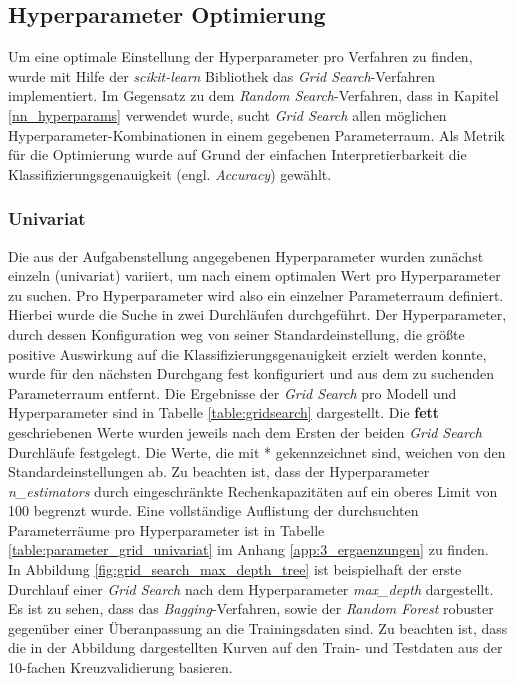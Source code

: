 \subsection{Hyperparameter Optimierung}
Um eine optimale Einstellung der Hyperparameter pro Verfahren zu finden, wurde mit Hilfe der \emph{scikit-learn} Bibliothek das \emph{Grid Search}-Verfahren implementiert. Im Gegensatz zu dem \emph{Random Search}-Verfahren, dass in Kapitel \ref{nn_hyperparams} verwendet wurde, sucht \emph{Grid Search} allen möglichen Hyperparameter-Kombinationen in einem gegebenen Parameterraum.  Als Metrik für die Optimierung wurde auf Grund der einfachen Interpretierbarkeit die Klassifizierungsgenauigkeit (engl. \emph{Accuracy}) gewählt.

\subsubsection{Univariat}
\label{section:univariat}
Die aus der Aufgabenstellung angegebenen Hyperparameter wurden zunächst einzeln (univariat) variiert, um nach einem optimalen Wert pro Hyperparameter zu suchen. Pro Hyperparameter wird also ein einzelner Parameterraum definiert. Hierbei wurde die Suche in zwei Durchläufen durchgeführt. Der Hyperparameter, durch dessen Konfiguration weg von seiner Standardeinstellung, die größte positive Auswirkung auf die Klassifizierungsgenauigkeit erzielt werden konnte, wurde für den  nächsten Durchgang fest konfiguriert und aus dem zu suchenden Parameterraum entfernt. Die Ergebnisse der \emph{Grid Search} pro Modell und Hyperparameter sind in Tabelle \ref{table:gridsearch} dargestellt. Die \textbf{fett} geschriebenen Werte wurden jeweils nach dem Ersten der beiden \emph{Grid Search} Durchläufe festgelegt. Die Werte, die mit * gekennzeichnet sind, weichen von den Standardeinstellungen ab. Zu beachten ist, dass der Hyperparameter \emph{n\_estimators} durch eingeschränkte Rechenkapazitäten auf ein oberes Limit von 100 begrenzt wurde. Eine vollständige Auflistung der durchsuchten Parameterräume pro Hyperparameter ist in Tabelle \ref{table:parameter_grid_univariat} im Anhang \ref{app:3_ergaenzungen} zu finden.\\
\noindent \hspace*{7mm}
In Abbildung \ref{fig:grid_search_max_depth_tree} ist  beispielhaft der erste Durchlauf einer \emph{Grid Search} nach dem Hyperparameter \emph{max\_depth} dargestellt. Es ist zu sehen, dass das \emph{Bagging}-Verfahren, sowie der \emph{Random Forest} robuster gegenüber einer Überanpassung an die Trainingsdaten sind. Zu beachten ist, dass die in der Abbildung dargestellten Kurven auf den Train- und Testdaten aus der 10-fachen Kreuzvalidierung basieren. 


